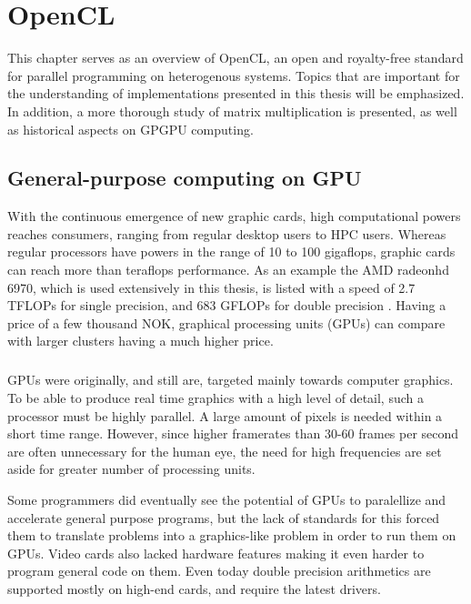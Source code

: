 \chapter{OpenCL}
\label{ch:OpenCL}
This chapter serves as an overview of OpenCL, an open and royalty-free standard for parallel programming on heterogenous systems.
Topics that are important for the understanding of implementations presented in this thesis will be emphasized.
In addition, a more thorough study of matrix multiplication is presented, as well as historical aspects on GPGPU computing.


\section{General-purpose computing on GPU}
With the continuous emergence of new graphic cards, high computational powers reaches consumers, ranging from regular desktop users to HPC users.
Whereas regular processors have powers in the range of 10 to 100 gigaflops, graphic cards can reach more than teraflops performance.
As an example the AMD radeonhd 6970, which is used extensively in this thesis, is listed with a speed of 2.7 TFLOPs for single precision, and 683 GFLOPs for double precision \cite{radeon6970}.
Having a price of a few thousand NOK, graphical processing units (GPUs) can compare with larger clusters having a much higher price.

\paragraph*{}
GPUs were originally, and still are, targeted mainly towards computer graphics.
To be able to produce real time graphics with a high level of detail, such a processor must be highly parallel.
A large amount of pixels is needed within a short time range.
However, since higher framerates than 30-60 frames per second are often unnecessary for the human eye, the need for high frequencies are set aside for greater number of processing units.

Some programmers did eventually see the potential of GPUs to paralellize and accelerate general purpose programs, but the lack of standards for this forced them to translate problems into a graphics-like problem in order to run them on GPUs.
Video cards also lacked hardware features making it even harder to program general code on them.
Even today double precision arithmetics are supported mostly on high-end cards, and require the latest drivers.

